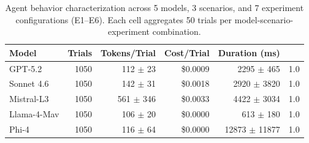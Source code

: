\begin{table}[t]
\centering
\caption{Agent behavior characterization across 5 models, 3 scenarios, and 7 experiment configurations (E1--E6). Each cell aggregates 50 trials per model-scenario-experiment combination.}
\label{tab:agent-characterization}
\small
\begin{tabular}{lrrrr}
\toprule
\textbf{Model} & \textbf{Trials} & \textbf{Tokens/Trial} & \textbf{Cost/Trial} & \textbf{Duration (ms)} \\
\midrule
    GPT-5.2 & 1050 & 112 $\pm$ 23 & \$0.0009 & 2295 $\pm$ 465 & 1.0 \\
    Sonnet 4.6 & 1050 & 142 $\pm$ 31 & \$0.0018 & 2920 $\pm$ 3820 & 1.0 \\
    Mistral-L3 & 1050 & 561 $\pm$ 346 & \$0.0033 & 4422 $\pm$ 3034 & 1.0 \\
    Llama-4-Mav & 1050 & 106 $\pm$ 20 & \$0.0000 & 613 $\pm$ 180 & 1.0 \\
    Phi-4 & 1050 & 116 $\pm$ 64 & \$0.0000 & 12873 $\pm$ 11877 & 1.0 \\
\bottomrule
\end{tabular}
\end{table}